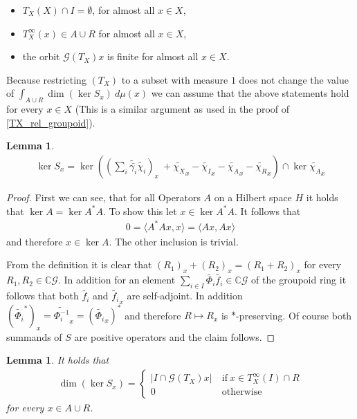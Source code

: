 \documentclass[12pt,a4paper]{scrartcl}
\theoremstyle{plain}
\newtheorem{Lemma}[Theorem]{Lemma}
\theoremstyle{definition}
\newcommand{\C}{\mathbb{C}} %
\newcommand{\2}{\mathbb{Z} / 2 \mathbb{Z}}
\newcommand{\G}{\mathcal{G}}
\newcommand{\1}{\bar{1}}
\newcommand{\0}{\bar{0}}
\begin{document}
\begin{itemize}
	\item $T_X(X) \cap I= \emptyset$, for almost all $x \in X$,
	\item $T_X^\infty(x) \in A \cup R$ for almost all $x \in X$,
	\item the orbit $\G (T_X)x$ is finite for almost all $x \in X$.
\end{itemize}
Because restricting $(T_X)$ to a subset with measure $1$ does not change the value of $\int_{A \cup R} \dim (\ker S_x) \ d \mu (x)$ we can assume that the above statements hold for every $x \in X$ (This is a similar argument as used in the proof of \ref{TX_rel_groupoid}).
\begin{Lemma}
	\begin{align*}
	\ker S_x = \ker((\sum_{i} \widetilde{\bar{\gamma_i}} \widetilde{\chi_i})_x \ + \widetilde{\chi_X}_x - \widetilde{\chi_I}_x - \widetilde{\chi_A}_x - \widetilde{\chi_R}_x) \cap \ker \widetilde{\chi_A}_x
	\end{align*}
\end{Lemma}
\begin{proof}
	First we can see, that for all Operators $A$ on a Hilbert space $H$ it holds that $\ker A = \ker A^*A$. To show this let $x \in \ker A^*A$. It follows that
	\begin{align*}
		0 = \langle A^*Ax, x \rangle = \langle Ax, Ax \rangle
	\end{align*}
	and therefore $x \in \ker A$. The other inclusion is trivial. 
	
	From the definition it is clear that $(R_1)_x + (R_2)_x = (R_1 + R_2)_x$ for every $R_1, R_2 \in \C \G$. In addition for an element $\sum_{i \in I} \widetilde{\Phi_i} \widetilde{f_i} \in \C\G$ of the  groupoid ring it follows that both $\widetilde{f_i}$ and $\widetilde{f_i}_x$ are self-adjoint. In addition $(\widetilde {\Phi_i}^*)_x = \widetilde {\Phi_i^{-1}}_x = (\widetilde {\Phi_i}_x)^*$  and therefore $R \mapsto R_x$ is $*$-preserving. Of course both summands of $S$ are positive operators and the claim follows.
\end{proof}
\begin{Lemma} \label{kerSx_berechnen}
	It holds that
	\begin{align*}
		\dim (\ker S_x) = \begin{cases}
		|I \cap \G (T_X)x| &~ \text{if} ~ x \in T_X^\infty(I) \cap R\\
		0 &~ \text{otherwise} 
		\end{cases}
	\end{align*}
	for every $x \in A \cup R$.
\end{Lemma}
\end{document}
